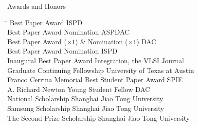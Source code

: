 
\begin{rSection}{Awards and Honors}
\begin{tabbing}
\hspace{3.3in}\= \hspace{3.1in}\= \kill
Best Paper Award \> ISPD  \\
Best Paper Award Nomination \> ASPDAC  \\
Best Paper Award ($\times 1$) \& Nomination ($\times 1$) \> DAC  \\
Best Paper Award Nomination \> ISPD  \\
Inaugural Best Paper Award \> Integration, the VLSI Journal  \\
Graduate Continuing Fellowship \> University of Texas at Austin  \\
Franco Cerrina Memorial Best Student Paper Award \> SPIE  \\
A. Richard Newton Young Student Fellow \> DAC  \\
    National Scholarship \> Shanghai Jiao Tong University  \\
    Samsung Scholarship \> Shanghai Jiao Tong University  \\
    The Second Prize Scholarship \> Shanghai Jiao Tong University 
\end{tabbing}
\end{rSection}

